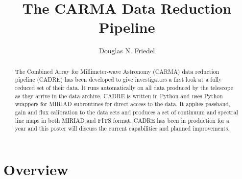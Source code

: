 
\resetcounters


\title{The CARMA Data Reduction Pipeline}
\author{Douglas N. Friedel}


\begin{abstract}
The Combined Array for Millimeter-wave Astronomy (CARMA) data reduction pipeline (CADRE) has been developed to give investigators a first look at a fully reduced set of their data. It runs automatically on all data produced by the telescope as they arrive in the data archive. CADRE is written in Python and uses Python wrappers for MIRIAD subroutines for direct access to the data. It applies passband, gain and flux calibration to the data sets and produces a set of continuum and spectral line maps in both MIRIAD and FITS format. CADRE has been in production for a year and this poster will discuss the current capabilities and planned improvements.
\end{abstract}

\section{Overview}

